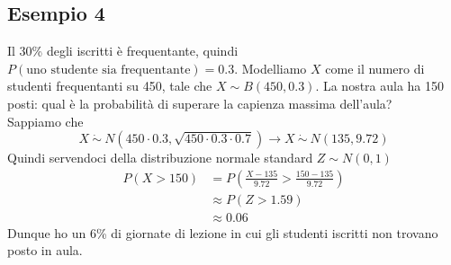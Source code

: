\documentclass[11pt]{report}
\begin{document}
\subsection{Esempio 4}
Il 30\% degli iscritti è frequentante, quindi $P(\text{uno studente sia frequentante}) = 0.3$. Modelliamo $X$ come il numero di studenti frequentanti su 450, tale che $X \sim B(450, 0.3)$. La nostra aula ha 150 posti: qual è la probabilità di superare la capienza massima dell'aula?\\
Sappiamo che
\begin{equation}
	X\ \dot\sim\ N \left( 450 \cdot 0.3, \sqrt{450 \cdot 0.3 \cdot 0.7} \right) \rightarrow X\ \dot\sim\ N(135, 9.72)
\end{equation}
Quindi servendoci della distribuzione normale standard $Z \sim N(0,1)$
\begin{equation}
	\begin{split}
		P(X > 150) & = P \left( \frac{X-135}{9.72} > \frac{150-135}{9.72} \right)\\
		& \approx P(Z > 1.59)\\
		& \approx 0.06
	\end{split}
\end{equation}
Dunque ho un 6\% di giornate di lezione in cui gli studenti iscritti non trovano posto in aula.
\end{document}
